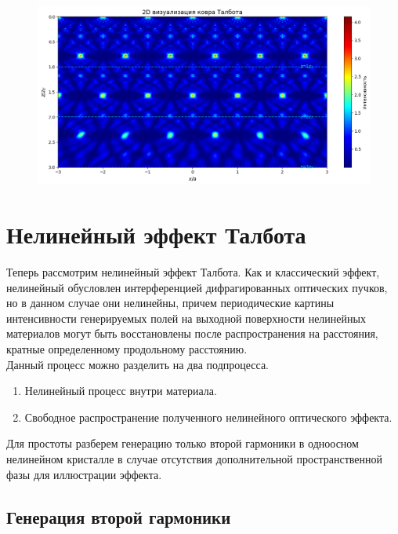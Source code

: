 \begin{figure}[H]
    \centering
    \includegraphics[width=1\linewidth]{images/2d_viz.png}
    \label{2dviz}
\end{figure}






\section{Нелинейный эффект Талбота}
Теперь рассмотрим нелинейный эффект Талбота. Как и классический эффект, нелинейный обусловлен интерференцией дифрагированных оптических пучков, но в данном случае они нелинейны, причем периодические картины интенсивности генерируемых полей на выходной поверхности нелинейных материалов могут быть восстановлены после распространения на расстояния, кратные определенному продольному расстоянию.\\

Данный процесс можно разделить на два подпроцесса.
\begin{enumerate}
    \item Нелинейный процесс внутри материала. 
    \item Свободное распространение полученного нелинейного оптического эффекта.
\end{enumerate}
Для простоты разберем генерацию только второй гармоники в одноосном нелинейном кристалле в случае отсутствия дополнительной пространственной фазы для иллюстрации эффекта.\\



\subsection{Генерация второй гармоники}


